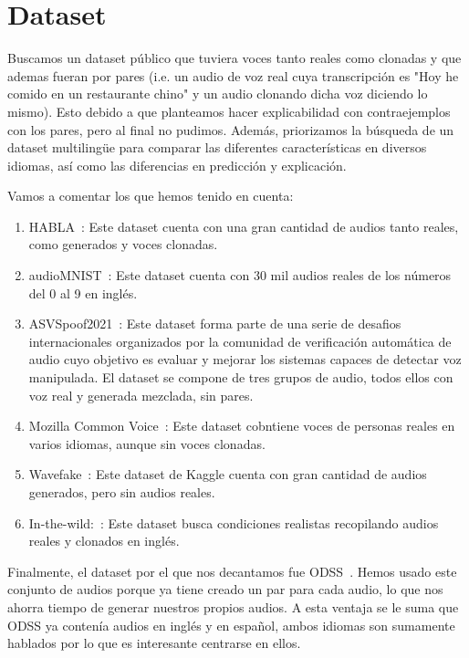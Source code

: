 \section{Dataset}
\label{sec:dataset}

Buscamos un dataset público que tuviera voces tanto reales como clonadas y que ademas fueran por pares (i.e. un audio de voz real cuya transcripción es "Hoy he comido en un restaurante chino" y un audio clonando dicha voz diciendo lo mismo). Esto debido a que planteamos hacer explicabilidad con contraejemplos con los pares, pero al final no pudimos. Además, priorizamos la búsqueda de un dataset multilingüe para comparar las diferentes características en diversos idiomas, así como las diferencias en predicción y explicación.

Vamos a comentar los que hemos tenido en cuenta:

\begin{enumerate}
	\item HABLA~\parencite{TamayoFlorez2023}: Este dataset cuenta con una gran cantidad de audios tanto reales, como generados y voces clonadas.
	\item audioMNIST~\parencite{Becker2024}: Este dataset cuenta con 30 mil audios reales de los números del 0 al 9 en inglés.
	\item ASVSpoof2021~\parencite{asvspoof2021_zenodo}: Este dataset forma parte de una serie de desafios internacionales organizados por la comunidad de verificación automática de audio cuyo objetivo es evaluar y mejorar los sistemas capaces de detectar voz manipulada. El dataset se compone de tres grupos de audio, todos ellos con voz real y generada mezclada, sin pares. 
	\item Mozilla Common Voice~\parencite{MozillaCommonVoice}: Este dataset cobntiene voces de personas reales en varios idiomas, aunque sin voces clonadas.
	\item Wavefake~\parencite{wavefakeKaggle}: Este dataset de Kaggle cuenta con gran cantidad de audios generados, pero sin audios reales.
	\item In-the-wild:~\parencite{2022In-the-Wild}: Este dataset busca condiciones realistas recopilando audios reales y clonados en inglés.
\end{enumerate}

Finalmente, el dataset por el que nos decantamos fue ODSS~\parencite{2023ODSS}. Hemos usado este conjunto de audios porque ya tiene creado un par para cada audio, lo que nos ahorra tiempo de generar nuestros propios audios. A esta ventaja se le suma que ODSS ya contenía audios en inglés y en español, ambos idiomas son sumamente hablados por lo que es interesante centrarse en ellos.

